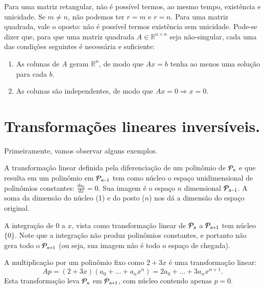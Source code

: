 Para uma matriz retangular, não é possível termos, ao mesmo tempo, existência e unicidade. Se $m\ne n$, não podemos ter $r=m$ e $r=n$. Para uma matriz quadrada, vale o oposto: não é possível termos existência sem unicidade. Pode-se dizer que, para que uma matriz quadrada $A\in {\mathbb{R}}^{n\times n}$ seja não-singular, cada uma das condições seguintes é necessária e suficiente:
\begin{enumerate}
    \item As colunas de $A$ geram ${\mathbb{R}}^n$, de modo que $Ax=b$ tenha ao menos uma solução para cada $b$.
    \item As colunas são independentes, de modo que $Ax=0 \Rightarrow x=0$.
\end{enumerate}

\section{Transformações lineares in\-ver\-sí\-veis. }

Primeiramente, vamos observar alguns exemplos.

\begin{exemplo*}
A transformação linear definida pela diferenciação de um polinômio de ${\cal{P}}_{n}$ e que resulta em um polinômio em ${\cal{P}}_{n-1}$ tem como núcleo o espaço unidimensional de polinômios constantes: $\frac{da_0}{dx} = 0$. Sua imagem é o espaço $n$ dimensional ${\cal{P}}_{n-1}$. A soma da dimensão do núcleo (1) e do posto ($n$) nos dá a dimensão do espaço original.
\end{exemplo*}

\begin{exemplo*}
A integração de $0$ a $x$, vista como transformação linear de ${\cal{P}}_n$ a ${\cal{P}}_{n+1}$ tem núcleo $\{0\}$. Note que a integração não produz polinômios constantes, e portanto não gera todo o ${\cal{P}}_{n+1}$ (ou seja, sua imagem não é todo o espaço de chegada).
\end{exemplo*}

\begin{exemplo}
  A multiplicação por um polinômio fixo como $2+3x$ é uma transformação linear:
  \begin{equation*}
    Ap = (2+3x)(a_0+\ldots+a_nx^n)=2a_0+\ldots+3a_nx^{n+1}.
  \end{equation*}
  Esta transformação leva ${\cal{P}}_n$ em ${\cal{P}}_{n+1}$, com núcleo contendo apenas $p=0$.
\end{exemplo}

